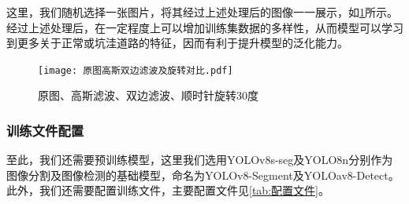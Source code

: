 \documentclass{MathorCupmodeling}
\begin{document}
	这里，我们随机选择一张图片，将其经过上述处理后的图像一一展示，如\textcolor{blue}{\cref{fig:原图高斯双边滤波及旋转对比}}所示。经过上述处理后，在一定程度上可以增加训练集数据的多样性，从而模型可以学习到更多关于正常或坑洼道路的特征，因而有利于提升模型的泛化能力。
	\begin{figure}[H]
		\centering
		\texttt{[image: 原图高斯双边滤波及旋转对比.pdf]}
		\caption{原图、高斯滤波、双边滤波、顺时针旋转30度}
		\label{fig:原图高斯双边滤波及旋转对比}
	\end{figure}

	\subsubsection{训练文件配置}
	至此，我们还需要预训练模型，这里我们选用YOLOv8s-seg及YOLO8n分别作为图像分割及图像检测的基础模型，命名为YOLOv8-Segment及YOLOav8-Detect。此外，我们还需要配置训练文件，主要配置文件见\textcolor{blue}{\cref{tab:配置文件}}。

\begin{table}[htbp]
	\centering
	\caption{模型配置文件}
	\label{tab:配置文件}
  \end{table}
  
\end{document}
